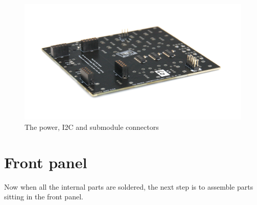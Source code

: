 \documentclass[10pt,a4paper,twocolumn]{article}
\begin{document}
\begin{figure}[h]
  \centering
  \includegraphics[width=\linewidth]{p03.jpg}
  \caption{The power, I2C and submodule connectors}
  \label{connectors}
\end{figure}

\section{Front panel}

Now when all the internal parts are soldered, the next step is to assemble
parts sitting in the front panel.
\end{document}
